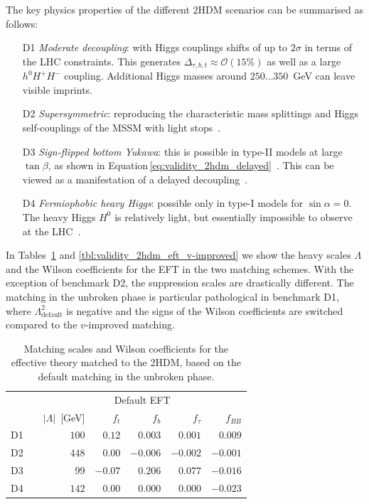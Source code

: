 The key physics properties of the different 2HDM scenarios can be
summarised as follows:
%
\begin{enumerate}
\item[D1] \emph{Moderate decoupling}: with Higgs couplings shifts of
  up to $2\sigma$ in terms of the LHC constraints.  This generates
  $\Delta_{\tau,b,t} \approx \mathcal{O}(15\%)$ as well as a large
  $h^0 H^+ H^-$ coupling. Additional Higgs masses around
  $250\dots350$~GeV can leave visible imprints.
%
\item[D2] \emph{Supersymmetric}: reproducing the characteristic mass
  splittings and Higgs self-couplings of the MSSM with light
  stops~\cite{Carena:2013ytb}.
%
\item[D3] \emph{Sign-flipped bottom Yukawa}: this is possible in
  type-II models at large $\tan\beta$, as shown in
  Equation\,\eqref{eq:validity_2hdm_delayed}~\cite{Ferreira:2014naa}. This
  can be viewed as a manifestation of a delayed
  decoupling~\cite{Haber:2000kq}.
%
\item[D4] \emph{Fermiophobic heavy Higgs}: possible only in type-I
  models for $\sin\alpha =0$. The heavy Higgs $H^0$ is relatively
  light, but essentially impossible to observe at the
  LHC~\cite{Hespel:2014sla}.
\end{enumerate}

In Tables~\ref{tbl:validity_2hdm_eft_default} and
\ref{tbl:validity_2hdm_eft_v-improved} we show the heavy scales
$\Lambda$ and the Wilson coefficients for the EFT in the two matching
schemes. With the exception of benchmark D2, the suppression scales
are drastically different. The matching in the unbroken phase is
particular pathological in benchmark D1, where
$\Lambda_{\text{default}}^2$ is negative and the signs of the Wilson
coefficients are switched compared to the $v$-improved matching.

\begin{table}
  \begin{tabular}{c c rrrrr }
    \toprule
    \multirow{2}{*}{}
    && \multicolumn{5}{c}{Default EFT} \\
    \cmidrule{3-7} 
    && $|\Lambda|$~[GeV] & $f_t$ & $f_{b}$  & $f_{\tau}$ & $f_{BB}$ \\
    \midrule
    D1 && $100$ & $0.12$ & $0.003$ & $0.001$ & $0.009$ \\
    D2 && $448$ & $0.00$ & $-0.006$ & $-0.002$  & $-0.001$ \\
    D3 && $99$ & $-0.07$ & $0.206$ & $0.077$ &  $-0.016$\\
    D4 && $142$ & $0.00$ & $0.000$ & $0.000$ &  $-0.023$\\
    \bottomrule
  \end{tabular}
  \caption[Default EFT description for the 2HDM benchmarks]{Matching scales and Wilson coefficients for the effective
    theory matched to the 2HDM, based on the default matching in the unbroken phase.}
 \label{tbl:validity_2hdm_eft_default}
\end{table}

